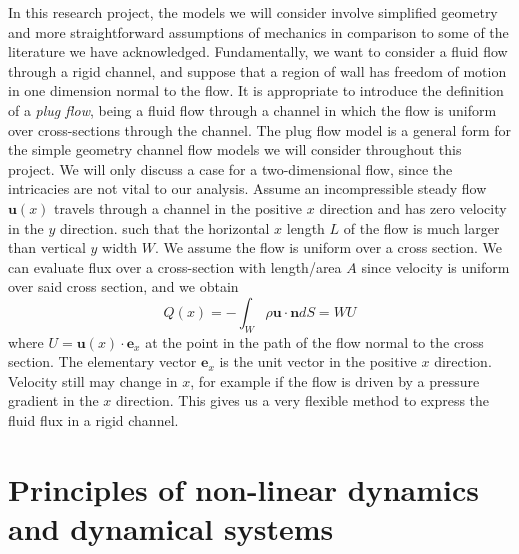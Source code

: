 \documentclass{report}
\begin{document}
In this research project, the models we will consider involve simplified geometry and more straightforward assumptions of mechanics in comparison to some of the literature we have acknowledged.
Fundamentally, we want to consider a fluid flow through a rigid channel, and suppose that a region of wall has freedom of motion in one dimension normal to the flow.
It is appropriate to introduce the definition of a \textit{plug flow}, being a fluid flow through a channel in which the flow is uniform over cross-sections through the channel.
The plug flow model is a general form for the simple geometry channel flow models we will consider throughout this project.
We will only discuss a case for a two-dimensional flow, since the intricacies are not vital to our analysis.
Assume an incompressible steady flow \(\mathbf{u}(x)\) travels through a channel in the positive $x$ direction and has zero velocity in the $y$ direction.
such that the horizontal $x$ length $L$ of the flow is much larger than vertical $y$ width $W$.
We assume the flow is uniform over a cross section.
We can evaluate flux over a cross-section with length/area $A$
since velocity is uniform over said cross section, and we obtain
\begin{equation}
	Q(x) = -\int_W \rho \mathbf{u}\cdot \mathbf{n} dS = WU
\end{equation}
where $U = \mathbf{u}(x) \cdot \mathbf{e}_x $ at the point in the path of the flow normal to the cross section.
The elementary vector $\mathbf{e}_x$ is the unit vector in the positive $x$ direction.
Velocity still may change in $x$, for example if the flow is driven by a pressure gradient in the $x$ direction.
This gives us a very flexible method to express the fluid flux in a rigid channel.

\section{Principles of non-linear dynamics and dynamical systems}
\end{document}
